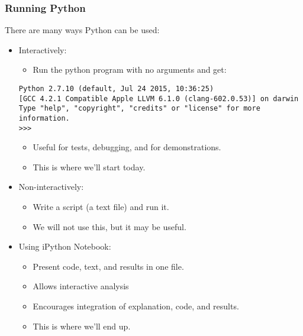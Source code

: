 \begin{frame}[fragile=singleslide]
\frametitle{Running Python}
There are many ways Python can be used:
\begin{itemize}
  \item Interactively:
  \begin{itemize}
    \item Run the python program with no arguments and get:
  \end{itemize}
\begin{lstlisting}
Python 2.7.10 (default, Jul 24 2015, 10:36:25) 
[GCC 4.2.1 Compatible Apple LLVM 6.1.0 (clang-602.0.53)] on darwin
Type "help", "copyright", "credits" or "license" for more information.
>>> 
\end{lstlisting}
  \begin{itemize}
    \item Useful for tests, debugging, and for demonstrations.
  	\item This is where we'll start today.
  \end{itemize}
  \item Non-interactively:
  \begin{itemize}
    \item Write a script (a text file) and run it.
  	\item We will not use this, but it may be useful.
  \end{itemize}
  \item Using iPython Notebook:
  \begin{itemize}
    \item Present code, text, and results in one file.
    \item Allows interactive analysis
    \item Encourages integration of explanation, code, and results.
  	\item This is where we'll end up.
  \end{itemize}
\end{itemize}
\end{frame}


